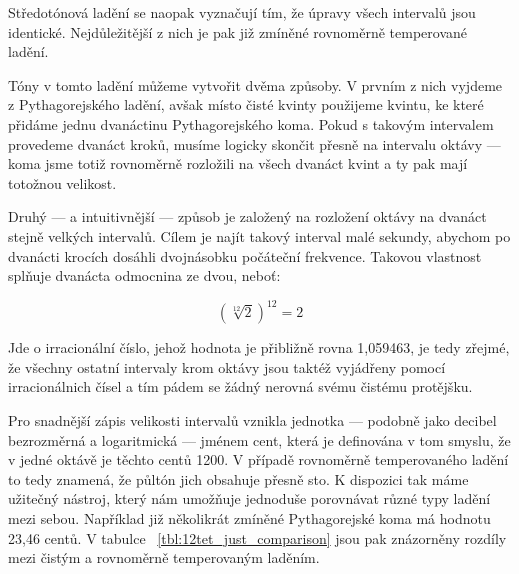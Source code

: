 \documentclass[12pt]{article}
\begin{document}
Středotónová ladění se naopak vyznačují tím, že úpravy všech intervalů jsou identické. Nejdůležitější z nich je pak již zmíněné rovnoměrně temperované ladění.

Tóny v tomto ladění můžeme vytvořit dvěma způsoby. V prvním z nich vyjdeme z Pythagorejského ladění, avšak místo čisté kvinty použijeme kvintu, ke které přidáme jednu dvanáctinu Pythagorejského koma. Pokud s takovým intervalem provedeme dvanáct kroků, musíme logicky skončit přesně na intervalu oktávy — koma jsme totiž rovnoměrně rozložili na všech dvanáct kvint a ty pak mají totožnou velikost.

Druhý — a intuitivnější — způsob je založený na rozložení oktávy na dvanáct stejně velkých intervalů. Cílem je najít takový interval malé sekundy, abychom po dvanácti krocích dosáhli dvojnásobku počáteční frekvence. Takovou vlastnost splňuje dvanácta odmocnina ze dvou, neboť:

\begin{equation}
(\sqrt[12]{2})^{12} = 2
\end{equation}

Jde o irracionální číslo, jehož hodnota je přibližně rovna 1,059463, je tedy zřejmé, že všechny ostatní intervaly krom oktávy jsou taktéž vyjádřeny pomocí irracionálnich čísel a tím pádem se žádný nerovná svému čistému protějšku.

Pro snadnější zápis velikosti intervalů vznikla jednotka — podobně jako decibel bezrozměrná a logaritmická — jménem cent, která je definována v tom smyslu, že v jedné oktávě je těchto centů 1200. V případě rovnoměrně temperovaného ladění to tedy znamená, že půltón jich obsahuje přesně sto. K dispozici tak máme užitečný nástroj, který nám umožňuje jednoduše porovnávat různé typy ladění mezi sebou.
Například již několikrát zmíněné Pythagorejské koma má hodnotu 23,46 centů. V tabulce ~\ref{tbl:12tet_just_comparison} jsou pak znázorněny rozdíly mezi čistým a rovnoměrně temperovaným laděním.
\end{document}
